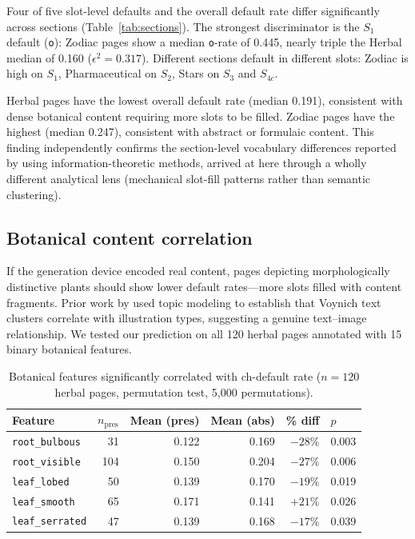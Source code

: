 \documentclass[12pt]{article}
\begin{document}
Four of five slot-level defaults and the overall default rate differ significantly across sections (Table~\ref{tab:sections}). The strongest discriminator is the $S_1$ default (\texttt{o}): Zodiac pages show a median \texttt{o}-rate of 0.445, nearly triple the Herbal median of 0.160 ($\epsilon^2 = 0.317$). Different sections default in different slots: Zodiac is high on $S_1$, Pharmaceutical on $S_2$, Stars on $S_3$ and $S_{4c}$.

Herbal pages have the lowest overall default rate (median 0.191), consistent with dense botanical content requiring more slots to be filled. Zodiac pages have the highest (median 0.247), consistent with abstract or formulaic content. This finding independently confirms the section-level vocabulary differences reported by \citet{Montemurro2013} using information-theoretic methods, arrived at here through a wholly different analytical lens (mechanical slot-fill patterns rather than semantic clustering).

\subsection{Botanical content correlation}
\label{sec:botanical}

If the generation device encoded real content, pages depicting morphologically distinctive plants should show lower default rates---more slots filled with content fragments. Prior work by \citet{Sterneck2021} used topic modeling to establish that Voynich text clusters correlate with illustration types, suggesting a genuine text--image relationship. We tested our prediction on all 120 herbal pages annotated with 15 binary botanical features.

\begin{table}[ht]
\centering
\caption{Botanical features significantly correlated with ch-default rate ($n = 120$ herbal pages, permutation test, 5,000 permutations).}
\label{tab:botanical}
\begin{tabular}{lrrrrl}
\toprule
Feature & $n_{\text{pres}}$ & Mean (pres) & Mean (abs) & \% diff & $p$ \\
\midrule
\texttt{root\_bulbous}  & 31  & 0.122 & 0.169 & $-28\%$ & 0.003 \\
\texttt{root\_visible}  & 104 & 0.150 & 0.204 & $-27\%$ & 0.006 \\
\texttt{leaf\_lobed}    & 50  & 0.139 & 0.170 & $-19\%$ & 0.019 \\
\texttt{leaf\_smooth}   & 65  & 0.171 & 0.141 & $+21\%$ & 0.026 \\
\texttt{leaf\_serrated} & 47  & 0.139 & 0.168 & $-17\%$ & 0.039 \\
\bottomrule
\end{tabular}
\end{table}
\end{document}
